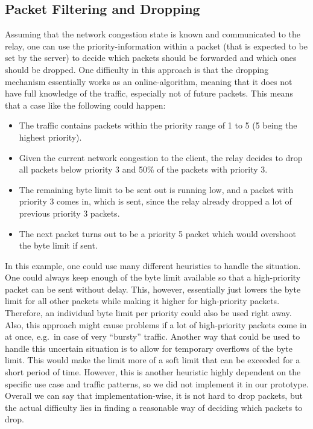 \subsection{Packet Filtering and Dropping} %
Assuming that the network congestion state is known and communicated to the relay, one can 
use the priority-information within a packet (that is expected to be set by the server) to
decide which packets should be forwarded and which ones should be dropped.
One difficulty in this approach is that the dropping mechanism essentially works as an 
online-algorithm, meaning that it does not have full knowledge of the traffic, especially not of 
future packets.
This means that a case like the following could happen:
\begin{itemize}
    \item The traffic contains packets within the priority range of 1 to 5 (5 being the highest priority).
    \item Given the current network congestion to the client, the relay decides to drop 
            all packets below priority 3 and 50\% of the packets with priority 3.
    \item The remaining byte limit to be sent out is running low, and a packet with priority 3 
            comes in, which is sent, since the relay already dropped a lot of previous priority 3 packets.
    \item The next packet turns out to be a priority 5 packet which would overshoot the byte limit if sent.
\end{itemize}
In this example, one could use many different heuristics to handle the situation.
One could always keep enough of the byte limit available so that a high-priority packet 
can be sent without delay.
This, however, essentially just lowers the byte limit for all other packets while making it higher 
for high-priority packets.
Therefore, an individual byte limit per priority could also be used right away.
Also, this approach might cause problems if a lot of high-priority packets come in at once, 
e.g.~in case of very ``bursty'' traffic.
Another way that could be used to handle this uncertain situation is to allow for temporary 
overflows of the byte limit.
This would make the limit more of a soft limit that can be exceeded for a short period of time.
However, this is another heuristic highly dependent on the specific use case and
traffic patterns, so we did not implement it in our prototype.
Overall we can say that implementation-wise, it is not hard to drop packets, but the actual
difficulty lies in finding a reasonable way of deciding which packets to drop.